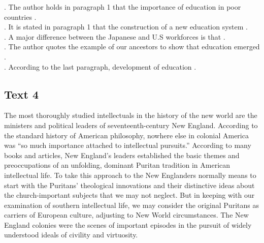 \begin{questions} . The author holds in paragraph 1 that the importance of education in poor countries \ltk{}.
\\ . It is stated in paragraph 1 that the construction of a new education system \ltk{}.
\\ . A major difference between the Japanese and U.S workforces is that \ltk{}.
\\ . The author quotes the example of our ancestors to show that education emerged \ltk{}.
\\ . According to the last paragraph, development of education \ltk{}.
\\ \end{questions}      \subsection{Text 4}
The most thoroughly studied intellectuals in the history of the new world are the ministers and political leaders of seventeenth-century New England. According to the standard history of American philosophy, nowhere else in colonial America was “so much importance attached to intellectual pursuits.” According to many books and articles, New England’s leaders established the basic themes and preoccupations of an unfolding, dominant Puritan tradition in American intellectual life.
To take this approach to the New Englanders normally means to start with the Puritans’ theological innovations and their distinctive ideas about the church-important subjects that we may not neglect. But in keeping with our examination of southern intellectual life, we may consider the original Puritans as carriers of European culture, adjusting to New World circumstances. The New England colonies were the scenes of important episodes in the pursuit of widely understood ideals of civility and virtuosity.
